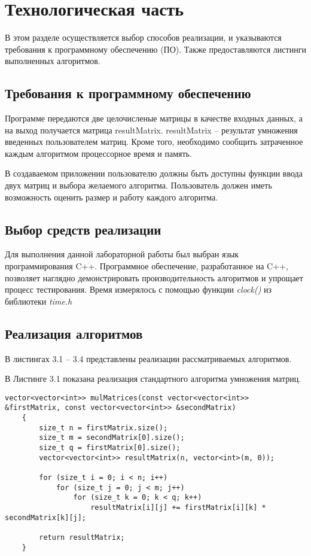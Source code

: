 \chapter{Технологическая часть}

В этом разделе осуществляется выбор способов реализации, и указываются требования к программному обеспечению (ПО). 
Также предоставляются листинги выполненных алгоритмов.

\section{Требования к программному обеспечению}

Программе передаются две целочисленые матрицы в качестве входных данных, а на выход получается матрица resultMatrix. 
resultMatrix -- результат умножения введенных пользователем матриц. 
Кроме того, необходимо сообщить затраченное каждым алгоритмом процессорное время и память.

В создаваемом приложении пользователю должны быть доступны функции ввода двух матриц и выбора желаемого алгоритма. 
Пользователь должен иметь возможность оценить размер и работу каждого алгоритма.

\section{Выбор средств реализации}

Для выполнения данной лабораторной работы был выбран язык программирования C++. 
Программное обеспечение, разработанное на C++, позволяет наглядно демонстрировать производительность алгоритмов и упрощает процесс тестирования. 
Время измерялось с помощью функции \textit{clock()} из библиотеки \textit{time.h} \cite{cpp-lang-time}

\section{Реализация алгоритмов}

В листингах 3.1 -- 3.4 представлены реализации рассматриваемых алгоритмов.

\hspace{0.6cm}В Листинге 3.1 показана реализация стандартного алгоритма умножения матриц.

\bigskip

\begin{lstlisting}[caption=Стандартный алгоритм умножения матриц]
	vector<vector<int>> mulMatrices(const vector<vector<int>> &firstMatrix, const vector<vector<int>> &secondMatrix)
	{
		size_t n = firstMatrix.size(); 
		size_t m = secondMatrix[0].size();
		size_t q = firstMatrix[0].size(); 
		vector<vector<int>> resultMatrix(n, vector<int>(m, 0));
		
		for (size_t i = 0; i < n; i++)
			for (size_t j = 0; j < m; j++)
				for (size_t k = 0; k < q; k++)
					resultMatrix[i][j] += firstMatrix[i][k] * secondMatrix[k][j];
		
		return resultMatrix;
	}
\end{lstlisting}

